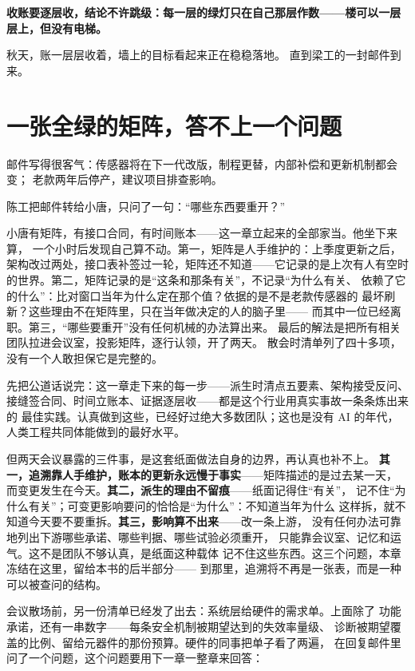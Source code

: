 \textbf{收账要逐层收，结论不许跳级：每一层的绿灯只在自己那层作数——楼可以一层层上，但没有电梯。}

秋天，账一层层收着，墙上的目标看起来正在稳稳落地。
直到梁工的一封邮件到来。

\section{一张全绿的矩阵，答不上一个问题}

邮件写得很客气：传感器将在下一代改版，制程更替，内部补偿和更新机制都会变；
老款两年后停产，建议项目排查影响。

陈工把邮件转给小唐，只问了一句：“哪些东西要重开？”

小唐有矩阵，有接口合同，有时间账本——这一章立起来的全部家当。他坐下来算，
一个小时后发现自己算不动。第一，矩阵是人手维护的：上季度更新之后，
架构改过两处，接口表补签过一轮，矩阵还不知道——它记录的是上次有人有空时
的世界。第二，矩阵记录的是“这条和那条有关”，不记录“为什么有关、
依赖了它的什么”：比对窗口当年为什么定在那个值？依据的是不是老款传感器的
最坏刷新？这些理由不在矩阵里，只在当年做决定的人的脑子里——
而其中一位已经离职。第三，“哪些要重开”没有任何机械的办法算出来。
最后的解法是把所有相关团队拉进会议室，投影矩阵，逐行认领，开了两天。
散会时清单列了四十多项，没有一个人敢担保它是完整的。

先把公道话说完：这一章走下来的每一步——派生时清点五要素、架构接受反问、
接缝签合同、时间立账本、证据逐层收——都是这个行业用真实事故一条条炼出来的
最佳实践。认真做到这些，已经好过绝大多数团队；这也是没有 AI 的年代，
人类工程共同体能做到的最好水平。

但两天会议暴露的三件事，是这套纸面做法自身的边界，再认真也补不上。
\textbf{其一，追溯靠人手维护，账本的更新永远慢于事实}——矩阵描述的是过去某一天，
而变更发生在今天。\textbf{其二，派生的理由不留痕}——纸面记得住“有关”，
记不住“为什么有关”；可变更影响要问的恰恰是“为什么”：不知道当年为什么
这样拆，就不知道今天要不要重拆。\textbf{其三，影响算不出来}——改一条上游，
没有任何办法可靠地列出下游哪些承诺、哪些判据、哪些试验必须重开，
只能靠会议室、记忆和运气。这不是团队不够认真，是纸面这种载体
记不住这些东西。这三个问题，本章冻结在这里，留给本书的后半部分——
到那里，追溯将不再是一张表，而是一种可以被查问的结构。

会议散场前，另一份清单已经发了出去：系统层给硬件的需求单。上面除了
功能承诺，还有一串数字——每条安全机制被期望达到的失效率量级、
诊断被期望覆盖的比例、留给元器件的那份预算。硬件的同事把单子看了两遍，
在回复邮件里问了一个问题，这个问题要用下一章一整章来回答：


